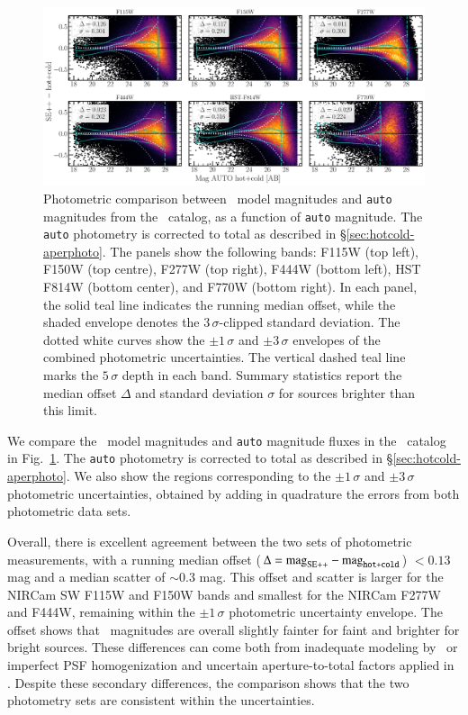\documentclass[longauth]{aa}
\begin{document}
\begin{figure}[th!]
\centering
\includegraphics[width=\textwidth]{figures/Mag-Compar_SEpp-hotcold.pdf}
\caption{
Photometric comparison between \SEpp\ model magnitudes and \texttt{auto} magnitudes from the \hotcold\  catalog, as a function of \texttt{auto} magnitude. The \texttt{auto} photometry is corrected to total as described in \S\ref{sec:hotcold-aperphoto}. The panels show the following bands: F115W (top left), F150W (top centre), F277W (top right), F444W (bottom left), HST F814W (bottom center), and F770W (bottom right). In each panel, the solid teal line indicates the running median offset, while the shaded envelope denotes the $3\,\sigma$-clipped standard deviation. The dotted white curves show the $\pm1\,\sigma$ and $\pm3\,\sigma$ envelopes of the combined photometric uncertainties. The vertical dashed teal line marks the $5\,\sigma$ depth in each band. Summary statistics report the median offset $\Delta$ and standard deviation $\sigma$ for sources brighter than this limit.}
\label{fig:Mag-Compar-SE++hotcold}
\end{figure}


We compare the \SEpp\ model magnitudes and \texttt{auto} magnitude fluxes in the \hotcold\ catalog in Fig.~\ref{fig:Mag-Compar-SE++hotcold}. The \texttt{auto} photometry is corrected to total as described in \S\ref{sec:hotcold-aperphoto}. We also show the regions  corresponding to the $\pm1\,\sigma$ and $\pm3\,\sigma$ photometric uncertainties, obtained by adding in quadrature the errors from both photometric data sets.


Overall, there is excellent agreement between the two sets of photometric measurements, with a running median offset ($\Delta = {\rm mag}_{\rm SE++} - {\rm mag}_{\texttt{hot+cold}}$) $<0.13$ mag and a median scatter of $\sim0.3$ mag. This offset and scatter is larger for the NIRCam SW F115W and F150W bands and smallest for the NIRCam F277W and F444W, remaining within the $\pm 1\, \sigma$ photometric uncertainty envelope. The offset shows that \SEpp\ magnitudes are overall slightly fainter for faint and brighter for bright sources. These differences can come both from inadequate modeling by \SEpp\ or imperfect PSF homogenization and uncertain aperture-to-total factors applied in \hotcold. Despite these secondary differences, the comparison shows that the two photometry sets are consistent within the uncertainties. 
\end{document}
